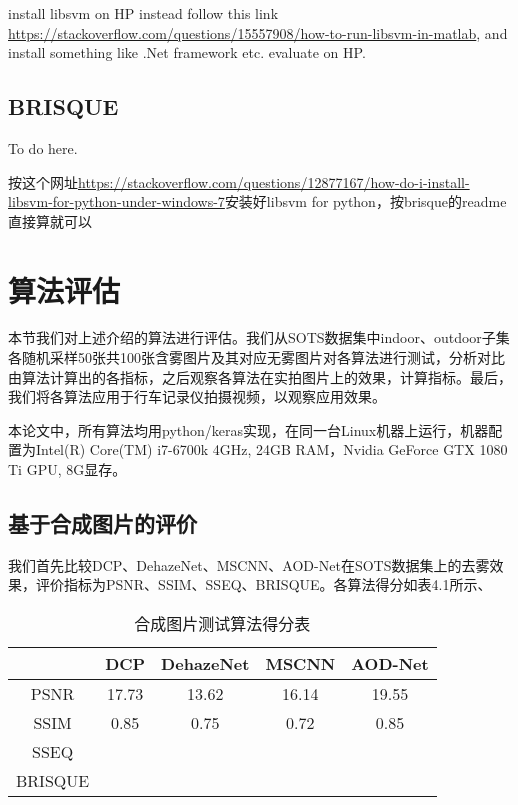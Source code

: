 \documentclass[a4paper, 12pt, oneside]{report}
\begin{document}
{{\Large install libsvm on HP instead} follow this link \url{https://stackoverflow.com/questions/15557908/how-to-run-libsvm-in-matlab}, and install something like .Net framework etc. evaluate on HP.

\subsection{BRISQUE\quad}
To do here\cite{ref26}.

按这个网址\url{https://stackoverflow.com/questions/12877167/how-do-i-install-libsvm-for-python-under-windows-7}安装好libsvm for python，按brisque的readme直接算就可以

\section{算法评估\quad}
本节我们对上述介绍的算法进行评估。我们从SOTS数据集中indoor、outdoor子集各随机采样50张共100张含雾图片及其对应无雾图片对各算法进行测试，分析对比由算法计算出的各指标，之后观察各算法在实拍图片上的效果，计算指标。最后，我们将各算法应用于行车记录仪拍摄视频，以观察应用效果。

本论文中，所有算法均用python/keras实现，在同一台Linux机器上运行，机器配置为Intel(R) Core(TM) i7-6700k 4GHz, 24GB RAM，Nvidia GeForce GTX 1080 Ti GPU, 8G显存。

\subsection{基于合成图片的评价\quad}
我们首先比较DCP、DehazeNet、MSCNN、AOD-Net在SOTS数据集上的去雾效果，评价指标为PSNR、SSIM、SSEQ、BRISQUE。各算法得分如表4.1所示、

\begin{table}[htbp]
  \centering
  \caption{合成图片测试算法得分表}
    \begin{tabular}{c|c|c|c|c}
    \hline
         & DCP    & DehazeNet  & MSCNN    & AOD-Net  \\
    \hline
    	PSNR	 & 17.73    & 13.62 & 16.14    & 19.55 \\
	\hline
     SSIM     & 0.85 & 0.75 & 0.72     & 0.85   \\
	\hline
    SSEQ &   &  &     &  \\
    \hline
     BRISQUE     &       &       &   & \\
     \hline
  

\end{tabular}
\end{table}}
\end{document}
